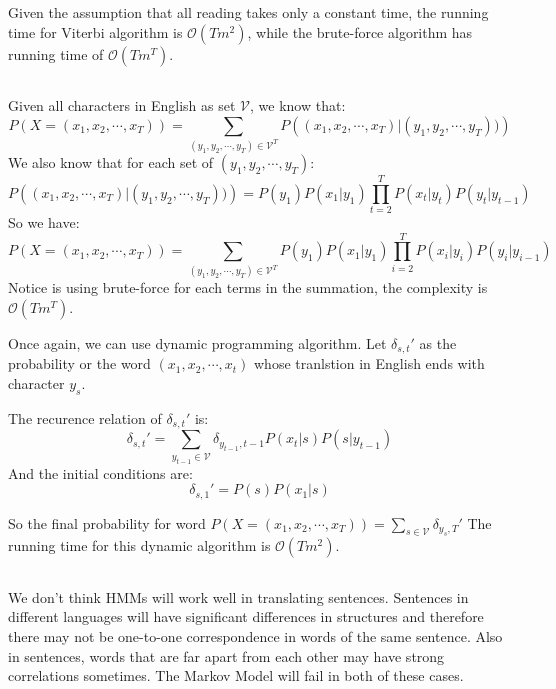 \documentclass[letterpaper,11pt]{article}
\begin{document}
\subsection{}

Given the assumption that all reading takes only a constant time,
the running time for Viterbi algorithm is $\mathcal{O}(Tm^2)$, while the
brute-force algorithm has running time of $\mathcal{O}(Tm^T)$.

\subsection{}
Given all characters in English as set $\mathcal{V}$,
we know that:
\begin{equation}
  P(X=(x_1,x_2,\cdots,x_T))=\sum_{(y_1,y_2,\cdots,y_T) \in \mathcal{V}^T}P
\left((x_1,x_2,\cdots,x_T)|(y_1,y_2,\cdots,y_T))\right)
\end{equation}
We also know that for each set of $(y_1,y_2,\cdots,y_T)$:\\
\begin{equation}
P\left((x_1,x_2,\cdots,x_T)|(y_1,y_2,\cdots,y_T))\right)=P(y_1)P(x_1|y_1)\prod_{t=2}^TP(x_t|y_t)P(y_t|y_{t-1})
\end{equation}
So we have:
\begin{equation}
  P(X=(x_1,x_2,\cdots,x_T))=\sum_{(y_1,y_2,\cdots,y_T) \in \mathcal{V}^T}P(y_1)P(x_1|y_1)\prod_{i=2}^TP(x_i|y_i)P(y_i|y_{i-1})
\end{equation}
Notice is using brute-force for each terms in the summation, the complexity is
$\mathcal{O}(Tm^T)$.

Once again, we can use dynamic programming algorithm. Let $\delta_{s,t}'$ as the
probability or the word $(x_1,x_2,\cdots,x_t)$ whose tranlstion in
English ends with character $y_s$.

The recurence relation of $\delta_{s,t}'$ is:
\[\delta_{s,t}'=\sum_{y_{t-1} \in \mathcal{V}}\delta_{y_{t-1},t-1}P(x_t|s)P(s|y_{t-1})\]
And the initial conditions are:
\[\delta_{s,1}'=P(s)P(x_1|s)\]

So the final probability for word $P\left( X=(x_1,x_2,\cdots,x_T) \right) =
\sum_{s \in \mathcal{V}}\delta_{y_s,T}'$
The running time for this dynamic algorithm is $\mathcal{O}(Tm^2)$.

\subsection{}
We don't think HMMs will work well in translating sentences. Sentences in
different languages will have significant differences in structures and
therefore there may not be one-to-one correspondence in words of the same
sentence. Also in sentences, words that are far apart from each other may have
strong correlations sometimes. The Markov Model will fail in both of these cases.
\end{document}
